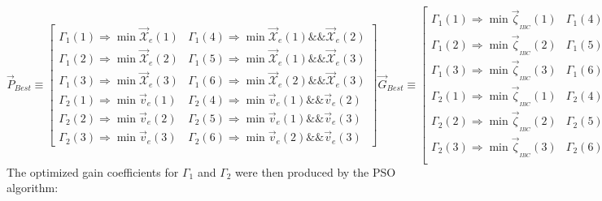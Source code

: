 \begin{subequations}
\begin{equation}
\vec{P}_{Best}\equiv
\begin{bmatrix}
\Gamma_1(1)\Rightarrow \min \vec{\mathcal{X}}_e(1) & \Gamma_1(4)\Rightarrow \min \vec{\mathcal{X}}_e(1)\&\&\vec{\mathcal{X}}_e(2)\\
\Gamma_1(2)\Rightarrow \min \vec{\mathcal{X}}_e(2)& \Gamma_1(5)\Rightarrow \min\vec{\mathcal{X}}_e(1)\&\&\vec{\mathcal{X}}_e(3) \\
\Gamma_1(3)\Rightarrow \min \vec{\mathcal{X}}_e(3) & \Gamma_1(6)\Rightarrow \min\vec{\mathcal{X}}_e(2)\&\&\vec{\mathcal{X}}_e(3)\\
\Gamma_2(1)\Rightarrow \min \vec{v}_e(1) & \Gamma_2(4)\Rightarrow \min\vec{v}_e(1)\&\&\vec{v}_e(2)\\
\Gamma_2(2)\Rightarrow \min \vec{v}_e(2) & \Gamma_2(5)\Rightarrow\min\vec{v}_e(1)\&\&\vec{v}_e(3)\\
\Gamma_2(3)\Rightarrow \min \vec{v}_e(3)& \Gamma_2(6)\Rightarrow\min\vec{v}_e(2)\&\&\vec{v}_e(3)
\end{bmatrix}
\end{equation}
\begin{equation}
\vec{G}_{Best}\equiv\begin{bmatrix}
\Gamma_1(1)\Rightarrow \min \vec{\zeta}_{_{IBC}}(1) & \Gamma_1(4)\Rightarrow\min\vec{\zeta}_{_{IBC}}(1)\&\& \vec{\zeta}_{_{IBC}}(2)\\
\Gamma_1(2)\Rightarrow \min \vec{\zeta}_{_{IBC}}(2) & \Gamma_1(5)\Rightarrow\min\vec{\zeta}_{_{IBC}}(1)\&\& \vec{\zeta}_{_{IBC}}(3)\\
\Gamma_1(3)\Rightarrow \min \vec{\zeta}_{_{IBC}}(3) & \Gamma_1(6)\Rightarrow\min\vec{\zeta}_{_{IBC}}(2)\&\& \vec{\zeta}_{_{IBC}}(3)\\
\Gamma_2(1)\Rightarrow \min \vec{\zeta}_{_{IBC}}(1) & \Gamma_2(4)\Rightarrow\min\vec{\zeta}_{_{IBC}}(1)\&\& \vec{\zeta}_{_{IBC}}(2)\\
\Gamma_2(2)\Rightarrow \min \vec{\zeta}_{_{IBC}}(2) & \Gamma_2(5)\Rightarrow\min\vec{\zeta}_{_{IBC}}(1)\&\& \vec{\zeta}_{_{IBC}}(3)\\
\Gamma_2(3)\Rightarrow \min \vec{\zeta}_{_{IBC}}(3) & \Gamma_2(6)\Rightarrow\min\vec{\zeta}_{_{IBC}}(2)\&\& \vec{\zeta}_{_{IBC}}(3)\\
\end{bmatrix}
\end{equation}
\end{subequations}
The optimized gain coefficients for $\Gamma_1$ and $\Gamma_2$ were then produced by the PSO algorithm:
